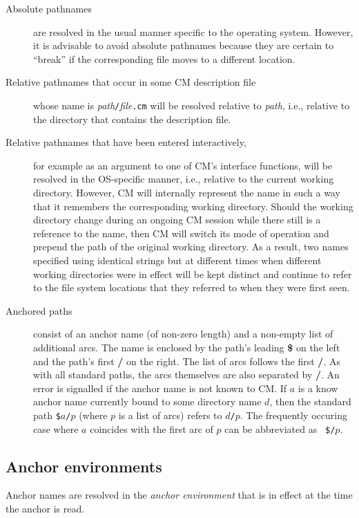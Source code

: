 \documentclass[titlepage,letterpaper]{article}
\begin{document}
\begin{description}
\item[Absolute pathnames] are resolved in the usual manner
specific to the operating system.  However, it is advisable to avoid
absolute pathnames because they are certain to ``break'' if the
corresponding file moves to a different location.
\item[Relative pathnames that occur in some CM description file] whose
name is {\it path}{\tt /}{\it file}{\tt .cm} will be resolved relative
to {\it path}, i.e., relative to the directory that contains the
description file.
\item[Relative pathnames that have been entered interactively,] for
example as an argument to one of CM's interface functions,
will be resolved in the OS-specific manner, i.e., relative to the
current working directory.  However, CM will internally represent the
name in such a way that it remembers the corresponding working
directory.  Should the working directory change during an ongoing CM
session while there still is a reference to the name, then CM will
switch its mode of operation and prepend the path of the original
working directory. As a result, two names specified using identical
strings but at different times when different working directories were
in effect will be kept distinct and continue to refer to the file
system locations that they referred to when they were first seen.
\item[Anchored paths] consist of an anchor name (of non-zero length)
and a non-empty list of additional arcs.  The name is enclosed by
the path's leading {\bf \$} on the left and the path's first {\bf /}
on the right.  The list of arcs follows the first {\bf /}.  As with
all standard paths, the arcs themselves are also separated by {\bf /}.
An error is signalled if the anchor name is not known to CM.
If $a$ is a know anchor name currently bound to some directory name
$d$, then the standard path {\tt \$}$a${\tt /}$p$ (where $p$ is a list
of arcs) refers to $d${\tt /}$p$.  The frequently occuring case where
$a$ coincides with the first arc of $p$ can be abbreviated as {\tt
\$/}$p$.
\end{description}

\subsection{Anchor environments}
\label{sec:anchor:env}

Anchor names are resolved in the {\em anchor environment} that is in
effect at the time the anchor is read.
\end{document}
